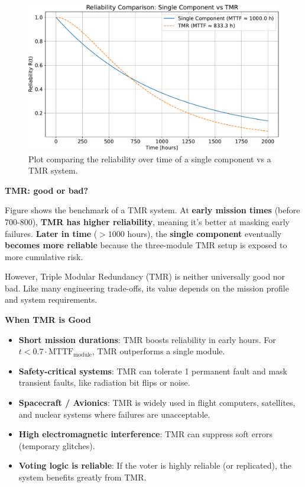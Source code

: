 \begin{figure}[!htp]
    \centering
    \includegraphics[width=\textwidth]{img/tmr.pdf}
    \captionsetup{singlelinecheck=off}
    \caption[]{Plot comparing the reliability over time of a single component vs a TMR system.}
    \label{fig: plot comparing the reliability over time of a single component vs a TMR system}
\end{figure}

\begin{flushleft}
	\textcolor{Green3}{ \textbf{TMR: good or bad?}}
\end{flushleft}
Figure \pageref{fig: plot comparing the reliability over time of a single component vs a TMR system} shows the benchmark of a TMR system. At \textbf{early mission times} (before 700-800), \textbf{TMR has higher reliability}, meaning it's better at masking early failures. \textbf{Later in time} ($> 1000$ hours), the \textbf{single component} eventually \textbf{becomes more reliable} because the three-module TMR setup is exposed to more cumulative risk.

\highspace
However, Triple Modular Redundancy (TMR) is neither universally good nor bad. Like many engineering trade-offs, its value depends on the mission profile and system requirements.

\highspace
\textcolor{Green3}{ \textbf{When TMR is Good}}
\begin{itemize}[label=\textcolor{Green3}{}]
    \item \textcolor{Green3}{\textbf{Short mission durations}}: TMR boosts reliability in early hours. For $t < 0.7 \cdot \text{MTTF}_{\text{module}}$, TMR outperforms a single module.
    \item \textcolor{Green3}{\textbf{Safety-critical systems}}: TMR can tolerate 1 permanent fault and mask transient faults, like radiation bit flips or noise.
    \item \textcolor{Green3}{\textbf{Spacecraft / Avionics}}: TMR is widely used in flight computers, satellites, and nuclear systems where failures are unacceptable.
    \item \textcolor{Green3}{\textbf{High electromagnetic interference}}: TMR can suppress soft errors (temporary glitches).
    \item \textcolor{Green3}{\textbf{Voting logic is reliable}}: If the voter is highly reliable (or replicated), the system benefits greatly from TMR.
\end{itemize}

